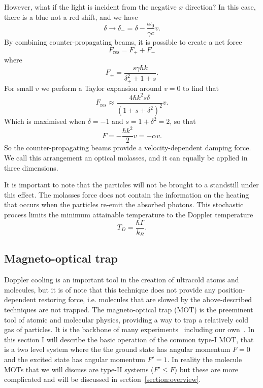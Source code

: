 However, what if the light is incident from the negative $x$ direction? In this
case, there is a blue not a red shift, and we have
%
\begin{equation}
  \delta \rightarrow \delta_- = \delta - \frac{\omega_0}{\gamma c}v.
\end{equation}
%
By combining counter-propagating beams, it is possible to create a net force
%
\begin{equation}
  F_\text{res} = F_+ + F_-
\end{equation}
%
where
%
\begin{equation}
  F_\pm = \frac{s\gamma\hbar k}{\delta_\pm^2 + 1 + s}.
\end{equation}
%
For small $v$ we perform a Taylor expansion around $v=0$ to find that
%
\begin{equation}
  F_\text{res} \approx \frac{4\hbar k^2 s \delta}{(1 + s
  +\delta^2)^2}v.
\end{equation}
%
Which is maximised when $\delta = -1$ and $s = 1 + \delta^2 = 2$, so that
%
\begin{equation}
  F = -\frac{\hbar k^2}{2} v = - \alpha v.
\end{equation}
%
So the counter-propagating beams provide a velocity-dependent damping
force. We call this arrangement an optical molasses, and it can equally be
applied in three dimensions.

It is important to note that the particles will not be brought to a standstill
under this effect. The molasses force does not contain the information
on the heating that occurs when the particles re-emit the absorbed photons.
This stochastic process limits the minimum attainable temperature to the
Doppler temperature~\cite{}
%
\begin{equation}
  T_D = \frac{\hbar\Gamma}{k_B}.
\end{equation}

\subsection{Magneto-optical trap}

Doppler cooling is an important tool in the creation of ultracold atoms and
molecules, but it is of note that this technique does not provide any
position-dependent restoring force, i.e. molecules that are slowed by the
above-described techniques are not trapped.
%
The magneto-optical trap (MOT) is the preeminent tool of atomic and molecular
physics, providing a way to trap a relatively cold gas of particles. It is the
backbone of many experiments~\cite{} including our own~\cite{}. In this section
I will describe the basic operation of the common type-I MOT, that is a two
level system where the the ground state has angular momentum $F=0$ and the
excited state has angular momentum $F'=1$.  In reality the molecule MOTs that
we will discuss are type-II systems ($F'\leq F$) but these are more complicated
and will be discussed in section~\ref{section:overview}.

